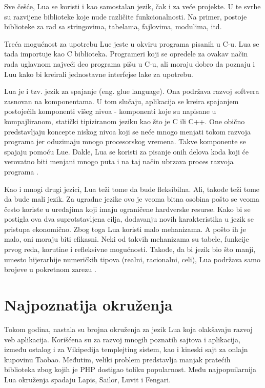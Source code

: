 \documentclass[a4paper]{article}
\begin{document}
Sve češće, Lua se koristi i kao samostalan jezik, čak i za veće projekte. U te svrhe su razvijene biblioteke koje nude različite funkcionalnosti. Na primer, postoje biblioteke za rad sa stringovima, tabelama, fajlovima, modulima, itd.

Treća mogućnost za upotrebu Lue jeste u okviru programa pisanih u C-u. Lua se tada importuje kao C biblioteka. Programeri koji se opredele za ovakav način rada uglavnom najveći deo programa pišu u C-u, ali moraju dobro da poznaju i Luu kako bi kreirali jednostavne interfejse lake za upotrebu.

Lua je i tzv. jezik za spajanje (eng. glue language). Ona podržava razvoj softvera zasnovan na komponentama. U tom slučaju, aplikacija se kreira spajanjem postojećih komponenti višeg nivoa - komponenti koje su napisane u kompajliranom, statički tipiziranom jeziku kao što je C ili C++. One obično predstavljaju koncepte niskog nivoa koji se neće mnogo menjati tokom razvoja programa jer oduzimaju mnogo procesorskog vremena. Takve komponente se spajaju pomoću Lue. Dakle, Lua se koristi za pisanje onih delova koda koji će verovatno biti menjani mnogo puta i na taj način ubrzava proces razvoja programa \cite{bookProgInLua}.

Kao i mnogi drugi jezici, Lua teži tome da bude fleksibilna. Ali, takođe teži tome da bude mali jezik. Za ugrađne jezike ovo je veoma bitna osobina pošto se veoma često koriste u uređajima koji imaju ograničene hardverske resurse. Kako bi se postigla ova dva suprotstavljena cilja, dodavanju novih karakteristika u jezik se pristupa ekonomično. Zbog toga Lua koristi malo mehanizama. A pošto ih je malo, oni moraju biti efikasni. Neki od takvih mehanizama su tabele, funkcije prvog reda, korutine i refleksivne mogućnosti. Takođe, da bi jezik bio što manji, umesto hijerarhije numeričkih tipova (realni, racionalni, celi), Lua podržava samo brojeve u pokretnom zarezu \cite{multiParadigms}.

\section{Najpoznatija okruženja}
\label{sec:framework}

Tokom godina, nastala su brojna okruženja za jezik Lua koja olakšavaju razvoj veb aplikacija. Korišćena su za razvoj mnogih poznatih sajtova i aplikacija, između ostalog i za Vikipedija templejting sistem, kao i kineski sajt za onlajn kupovinu Taobao. Međutim, veliki problem predstavlja manjak pratećih biblioteka zbog kojih je PHP dostigao toliku popularnost. 
Među najpopuilarnija Lua okruženja spadaju Lapis, Sailor, Luvit i Fengari. 
\end{document}
